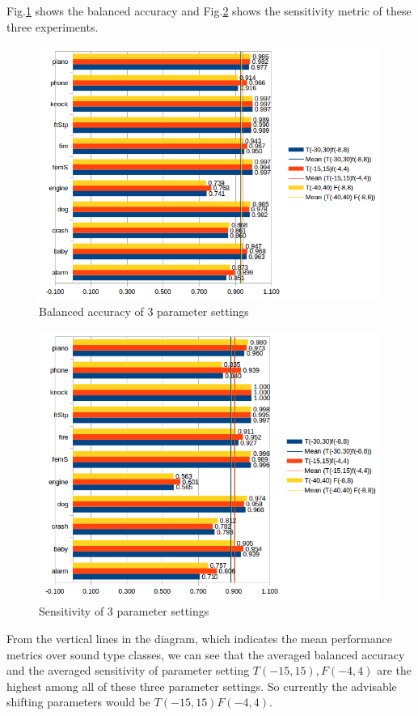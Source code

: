 Fig.\ref{fig:balcompare3} shows the balanced accuracy and Fig.\ref{fig:senscompare} shows the sensitivity metric of these three experiments. 
\begin{figure}[h!]
	\caption{Balanced accuracy of 3 parameter settings}
	\label{fig:balcompare3}
	\centering
	\includegraphics[scale=0.85]{../image/chapter3/bal_params.png}
\end{figure}
\begin{figure}[h!]
	\caption{Sensitivity of 3 parameter settings}
	\label{fig:senscompare}
	\centering
	\includegraphics[scale=0.85]{../image/chapter3/sens_params.png}
\end{figure}
From the vertical lines in the diagram, which indicates the mean performance metrics over sound type classes, we can see that the averaged balanced accuracy and the averaged sensitivity of parameter setting $T(-15,15),F(-4,4)$ are the highest among all of these three parameter settings. So currently the  advisable shifting parameters would be $T(-15,15)F(-4,4)$.

